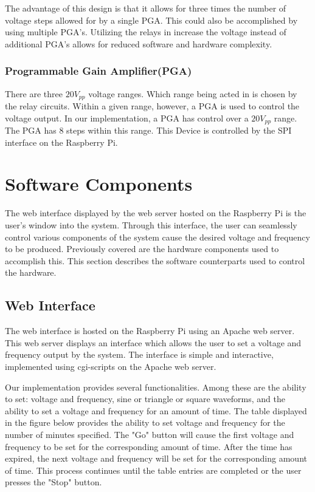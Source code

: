 \documentclass{article}	%
\begin{document}
\begin{multicols}{2}
The advantage of this design is that
it allows for three times the number of voltage steps
allowed for by a single PGA.
This could also be accomplished by using multiple PGA's.
Utilizing the relays in increase the voltage instead of additional PGA's
allows for reduced software and hardware complexity.

\subsubsection{Programmable Gain Amplifier(PGA)}
There are three $20V_{pp}$ voltage ranges.
Which range being acted in is chosen by the relay circuits.
Within a given range,
however,
a PGA is used to control the voltage output.
In our implementation,
a PGA has control over a $20V_{pp}$ range.
The PGA has 8 steps within this range.
This Device is controlled by 
the SPI interface on the Raspberry Pi.



\section{Software Components}
The web interface displayed by
the web server hosted on the Raspberry Pi
is the user's window into the system.
Through this interface,
the user can seamlessly control various
components of the system cause 
the desired voltage and frequency 
to be produced.
Previously covered are
the hardware components used to accomplish this.
This section describes the software counterparts
used to control the hardware.

\subsection{Web Interface}
The web interface is hosted on the Raspberry Pi using an Apache web server.
This web server displays an interface which allows the user to
set a voltage and frequency output by the system. 
The interface is simple and interactive,
implemented using cgi-scripts on the Apache web server.

Our implementation provides several functionalities.
Among these are
the ability to set:
voltage and frequency,
sine or triangle or square waveforms,
and the ability to set a voltage and frequency for an amount of time.
The table displayed
in the figure below
provides the ability to set voltage and frequency for the number
of minutes specified.
The "Go" button will cause the first
voltage and frequency to be set for the corresponding amount of time.
After the time has expired,
the next voltage and frequency will be set for the corresponding amount of time.
This process continues until the table entries are completed or
the user presses the "Stop" button.


\end{multicols}
\end{document}
